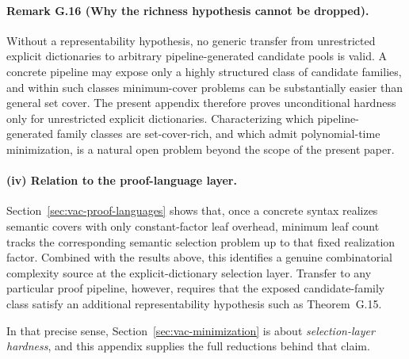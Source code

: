 \paragraph{Remark G.16 (Why the richness hypothesis cannot be dropped).}
Without a representability hypothesis, no generic transfer from unrestricted explicit dictionaries to arbitrary pipeline-generated candidate pools is valid. A concrete pipeline may expose only a highly structured class of candidate families, and within such classes minimum-cover problems can be substantially easier than general set cover. The present appendix therefore proves unconditional hardness only for unrestricted explicit dictionaries. Characterizing which pipeline-generated family classes are set-cover-rich, and which admit polynomial-time minimization, is a natural open problem beyond the scope of the present paper.

\paragraph{(iv) Relation to the proof-language layer.}
Section~\ref{sec:vac-proof-languages} shows that, once a concrete syntax realizes semantic covers with only constant-factor leaf overhead, minimum leaf count tracks the corresponding semantic selection problem up to that fixed realization factor. Combined with the results above, this identifies a genuine combinatorial complexity source at the explicit-dictionary selection layer. Transfer to any particular proof pipeline, however, requires that the exposed candidate-family class satisfy an additional representability hypothesis such as Theorem~G.15.

In that precise sense, Section~\ref{sec:vac-minimization} is about \emph{selection-layer hardness}, and this appendix supplies the full reductions behind that claim.
